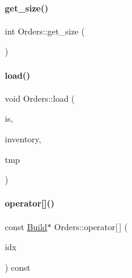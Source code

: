 \mbox{\label{class_orders_a9b6a5342d1fe2954f061d91609d3fe89}} 
\paragraph{\texorpdfstring{get\_size()}{get\_size()}}
{\footnotesize\ttfamily int Orders\+::get\+\_\+size (\begin{DoxyParamCaption}{ }\end{DoxyParamCaption})\hspace{0.3cm}{\ttfamily [inline]}}

\mbox{\label{class_orders_af0edb320aab3dcae0ee615a5459b5595}} 
\paragraph{\texorpdfstring{load()}{load()}}
{\footnotesize\ttfamily void Orders\+::load (\begin{DoxyParamCaption}\item[{std\+::fstream \&}]{is,  }\item[{\mbox{\hyperlink{class_inventory}{Inventory}} \&}]{inventory,  }\item[{\mbox{\hyperlink{struct_temp_input}{Temp\+Input}} \&}]{tmp }\end{DoxyParamCaption})}

\mbox{\label{class_orders_aab4445872bb7f3d952ebc89f6b2bd146}} 
\paragraph{\texorpdfstring{operator[]()}{operator[]()}\hspace{0.1cm}{\footnotesize\ttfamily [1/2]}}
{\footnotesize\ttfamily const \mbox{\hyperlink{class_build}{Build}}$\ast$ Orders\+::operator\mbox{[}$\,$\mbox{]} (\begin{DoxyParamCaption}\item[{int}]{idx }\end{DoxyParamCaption}) const\hspace{0.3cm}{\ttfamily [inline]}}

\mbox{\label{class_orders_aca77a601a993ef2d5dcfb71b9ee41542}} 
